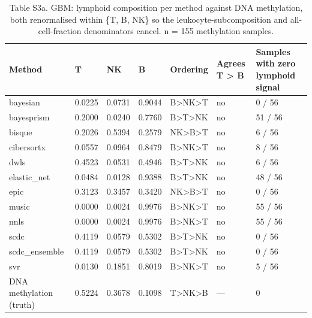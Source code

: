 \begin{table}[htbp]
\centering
\small
\caption{Table S3a. GBM: lymphoid composition per method against DNA methylation, both renormalised within \{T, B, NK\} so the leukocyte-subcomposition and all-cell-fraction denominators cancel. n = 155 methylation samples.}
\label{tab:S3_lymphoid_gbm}
\begin{tabular}{lllllll}
\toprule
\textbf{Method} & \textbf{T} & \textbf{NK} & \textbf{B} & \textbf{Ordering} & \textbf{Agrees T > B} & \textbf{Samples with zero lymphoid signal} \\
\midrule
bayesian & 0.0225 & 0.0731 & 0.9044 & B>NK>T & no & 0 / 56 \\
bayesprism & 0.2000 & 0.0240 & 0.7760 & B>T>NK & no & 51 / 56 \\
bisque & 0.2026 & 0.5394 & 0.2579 & NK>B>T & no & 6 / 56 \\
cibersortx & 0.0557 & 0.0964 & 0.8479 & B>NK>T & no & 8 / 56 \\
dwls & 0.4523 & 0.0531 & 0.4946 & B>T>NK & no & 6 / 56 \\
elastic\_net & 0.0484 & 0.0128 & 0.9388 & B>T>NK & no & 48 / 56 \\
epic & 0.3123 & 0.3457 & 0.3420 & NK>B>T & no & 0 / 56 \\
music & 0.0000 & 0.0024 & 0.9976 & B>NK>T & no & 55 / 56 \\
nnls & 0.0000 & 0.0024 & 0.9976 & B>NK>T & no & 55 / 56 \\
scdc & 0.4119 & 0.0579 & 0.5302 & B>T>NK & no & 0 / 56 \\
scdc\_ensemble & 0.4119 & 0.0579 & 0.5302 & B>T>NK & no & 0 / 56 \\
svr & 0.0130 & 0.1851 & 0.8019 & B>NK>T & no & 5 / 56 \\
DNA methylation (truth) & 0.5224 & 0.3678 & 0.1098 & T>NK>B & — & 0 \\
\bottomrule
\end{tabular}
\end{table}

